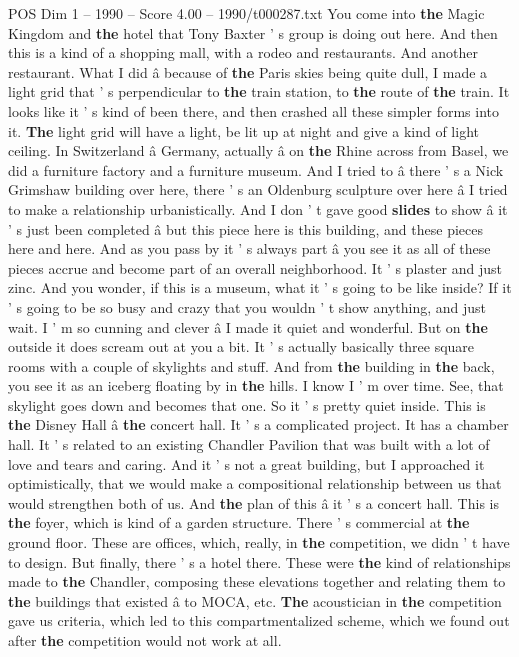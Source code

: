 \begin{textsample}{POS Dim 1 – 1990 – Score 4.00 – 1990/t000287.txt}
You come into \textbf{the} Magic Kingdom and \textbf{the} hotel that Tony Baxter ' s group is doing out here.
And then this is a kind of a shopping mall, with a rodeo and restaurants.
And another restaurant.
What I did â because of \textbf{the} Paris skies being quite dull, I made a light grid that ' s perpendicular to \textbf{the} train station, to \textbf{the} route of \textbf{the} train.
It looks like it ' s kind of been there, and then crashed all these simpler forms into it. \textbf{The} light grid will have a light, be lit up at night and give a kind of light ceiling.
In Switzerland â Germany, actually â on \textbf{the} Rhine across from Basel, we did a furniture factory and a furniture museum.
And I tried to â there ' s a Nick Grimshaw building over here, there ' s an Oldenburg sculpture over here â I tried to make a relationship urbanistically.
And I don ' t gave good \textbf{slides} to show â it ' s just been completed â but this piece here is this building, and these pieces here and here.
And as you pass by it ' s always part â you see it as all of these pieces accrue and become part of an overall neighborhood.
It ' s plaster and just zinc.
And you wonder, if this is a museum, what it ' s going to be like inside?
If it ' s going to be so busy and crazy that you wouldn ' t show anything, and just wait.
I ' m so cunning and clever â I made it quiet and wonderful.
But on \textbf{the} outside it does scream out at you a bit.
It ' s actually basically three square rooms with a couple of skylights and stuff.
And from \textbf{the} building in \textbf{the} back, you see it as an iceberg floating by in \textbf{the} hills.
I know I ' m over time.
See, that skylight goes down and becomes that one.
So it ' s pretty quiet inside.
This is \textbf{the} Disney Hall â \textbf{the} concert hall.
It ' s a complicated project.
It has a chamber hall.
It ' s related to an existing Chandler Pavilion that was built with a lot of love and tears and caring.
And it ' s not a great building, but I approached it optimistically, that we would make a compositional relationship between us that would strengthen both of us.
And \textbf{the} plan of this â it ' s a concert hall.
This is \textbf{the} foyer, which is kind of a garden structure.
There ' s commercial at \textbf{the} ground floor.
These are offices, which, really, in \textbf{the} competition, we didn ' t have to design.
But finally, there ' s a hotel there.
These were \textbf{the} kind of relationships made to \textbf{the} Chandler, composing these elevations together and relating them to \textbf{the} buildings that existed â to MOCA, etc. \textbf{The} acoustician in \textbf{the} competition gave us criteria, which led to this compartmentalized scheme, which we found out after \textbf{the} competition would not work at all.

\end{textsample}
